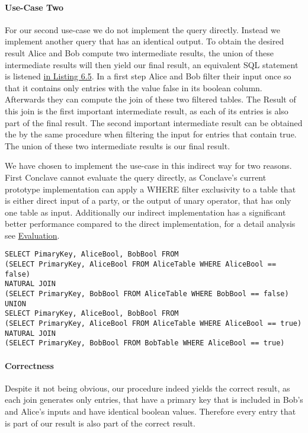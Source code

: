 \paragraph{Use-Case Two}
For our second use-case we do not implement the query directly. Instead we implement another query that has an identical output. To obtain the desired result Alice and Bob compute two  intermediate results, the union of these intermediate results will then yield our final result, an equivalent SQL statement is listened \hyperref[use_case2_alternative_sql]{ in Listing 6.5}.
In a first step Alice and Bob filter their input once so that it contains only entries with the value false in its boolean column. Afterwards they can compute the join of these two filtered tables. The Result of this join is the first important intermediate result, as each of its entries is also part of the final result. The second important intermediate result can be obtained the by the same procedure when filtering the input for entries that contain true.
The union of these two intermediate results is our final result. 

We have chosen to implement the use-case in this indirect way for two reasons. First Conclave cannot evaluate the query directly, as Conclave's current prototype implementation can apply a WHERE filter exclusivity to a table that is either direct input of a party, or the output of unary operator, that has only one table as input. Additionally our indirect implementation has a significant better performance compared to the direct implementation, for a detail analysis see   \hyperref[evaluation]{ Evaluation}.  


\label{use_case2_alternative_sql}
\begin{lstlisting}[caption={  Functional equivalent SQL statement for our implementation of use-case two }]
SELECT PimaryKey, AliceBool, BobBool FROM
(SELECT PrimaryKey, AliceBool FROM AliceTable WHERE AliceBool == false) 
NATURAL JOIN	
(SELECT PrimaryKey, BobBool FROM AliceTable WHERE BobBool == false)	
UNION
SELECT PimaryKey, AliceBool, BobBool FROM
(SELECT PrimaryKey, AliceBool FROM AliceTable WHERE AliceBool == true) 
NATURAL JOIN	
(SELECT PrimaryKey, BobBool FROM BobTable WHERE AliceBool == true)
\end{lstlisting}

\paragraph{Correctness}
Despite it not being obvious, our procedure indeed yields the correct result, as each join generates only entries, that have a primary key that is included in Bob's and Alice's inputs and have identical boolean values. Therefore every entry that is part of our result is also part of the correct result.

